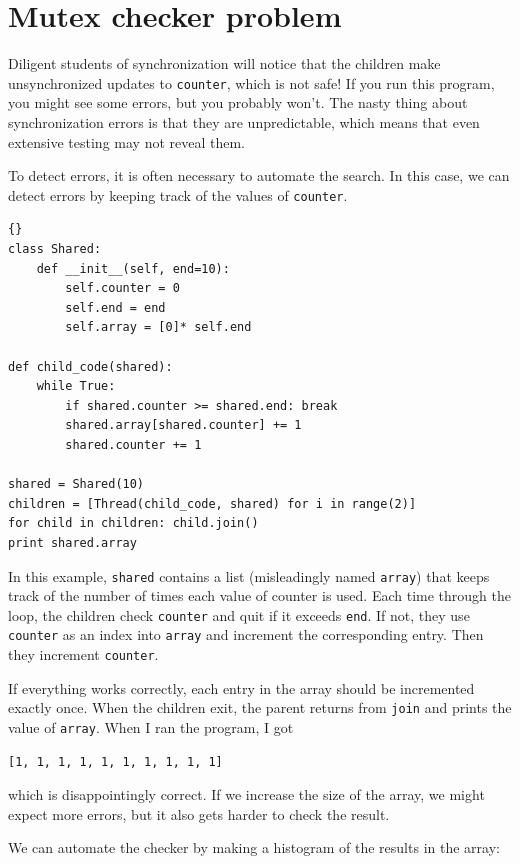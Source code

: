 \documentclass{book}
\begin{document}
\section{Mutex checker problem}

Diligent students of synchronization will notice that the
children make unsynchronized updates to {\tt counter}, which
is not safe!  If you run this program, you might see some
errors, but you probably won't.  The nasty thing about synchronization
errors is that they are unpredictable, which means that even
extensive testing may not reveal them.

To detect errors, it is often necessary to automate the search.
In this case, we can detect errors by keeping track of the values
of {\tt counter}.

\begin{latin}
\begin{lstlisting}[title={}]{}
class Shared:
    def __init__(self, end=10):
        self.counter = 0
        self.end = end
        self.array = [0]* self.end

def child_code(shared):
    while True:
        if shared.counter >= shared.end: break
        shared.array[shared.counter] += 1
        shared.counter += 1

shared = Shared(10)
children = [Thread(child_code, shared) for i in range(2)]
for child in children: child.join()
print shared.array
\end{lstlisting}
\end{latin}

In this example, {\tt shared} contains a list (misleadingly
named {\tt array}) that keeps track of the number of times
each value of counter is used.
Each time through the loop, the children check {\tt counter}
and quit if it exceeds {\tt end}.  If not, they use {\tt counter}
as an index into {\tt array} and increment the corresponding
entry.  Then they increment {\tt counter}.

If everything works correctly, each entry in the array should
be incremented exactly once.  When the children exit, the parent
returns from {\tt join} and prints the value of {\tt array}.
When I ran the program, I got
%
\begin{verbatim}
[1, 1, 1, 1, 1, 1, 1, 1, 1, 1]
\end{verbatim}
%
which is disappointingly correct.  If we increase the size of
the array, we might expect more errors, but it also gets harder
to check the result.

\newpage
We can automate the checker by making
a histogram of the results in the array:
\end{document}
